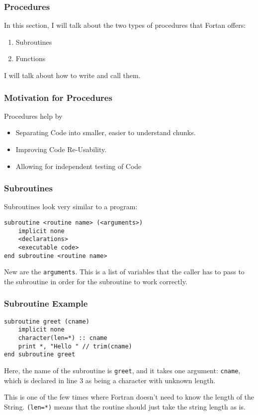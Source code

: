 \begin{frame}[fragile]
  \frametitle{Procedures}

  In this section, I will talk about the two types of procedures
  that Fortan offers:

  \begin{enumerate}
    \item Subroutines
    \item Functions
  \end{enumerate}

  I will talk about how to write and call them.

\end{frame}

\begin{frame}[fragile]
  \frametitle{Motivation for Procedures}

  Procedures help by

  \begin{itemize}
    \item Separating Code into smaller, easier to understand chunks.
    \item Improving Code Re-Usability.
    \item Allowing for independent testing of Code
  \end{itemize}

\end{frame}

\begin{frame}[fragile]
  \frametitle{Subroutines}

  Subroutines look very similar to a program:

  \begin{lstlisting}
subroutine <routine name> (<arguments>)
    implicit none
    <declarations>
    <executable code>
end subroutine <routine name>
  \end{lstlisting}

  New are the \texttt{arguments}. 
  This is a list of variables that the caller has to pass to the
  subroutine in order for the subroutine to work correctly.

\end{frame}

\begin{frame}[fragile]
  \frametitle{Subroutine Example}

  \begin{lstlisting}
subroutine greet (cname)
    implicit none
    character(len=*) :: cname
    print *, "Hello " // trim(cname)
end subroutine greet
  \end{lstlisting}

  Here, the name of the subroutine is \texttt{greet}, and it takes one argument:
  \texttt{cname}, which is declared in line 3 as being a character with unknown length.

  This is one of the few times where Fortran doesn't need to know the length of the
  String. 
  \texttt{(len=*)} means that the routine should just take the string length as is.

\end{frame}

